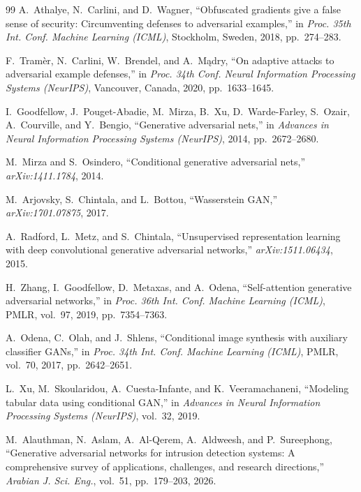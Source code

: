 \documentclass[11pt,a4paper]{article}
\begin{document}
\begin{thebibliography}{99}
 A.~Athalye, N.~Carlini, and D.~Wagner, ``Obfuscated
gradients give a false sense of security: Circumventing defenses to adversarial
examples,'' in \emph{Proc. 35th Int. Conf. Machine Learning (ICML)}, Stockholm,
Sweden, 2018, pp.~274--283.

 F.~Tram\`er, N.~Carlini, W.~Brendel, and A.~M\k{a}dry, ``On
adaptive attacks to adversarial example defenses,'' in \emph{Proc. 34th Conf.
Neural Information Processing Systems (NeurIPS)}, Vancouver, Canada, 2020,
pp.~1633--1645.

 I.~Goodfellow, J.~Pouget-Abadie, M.~Mirza, B.~Xu, D.~Warde-Farley,
S.~Ozair, A.~Courville, and Y.~Bengio, ``Generative adversarial nets,'' in
\emph{Advances in Neural Information Processing Systems (NeurIPS)}, 2014,
pp.~2672--2680.

 M.~Mirza and S.~Osindero, ``Conditional generative adversarial
nets,'' \emph{arXiv:1411.1784}, 2014.

 M.~Arjovsky, S.~Chintala, and L.~Bottou, ``Wasserstein GAN,''
\emph{arXiv:1701.07875}, 2017.

 A.~Radford, L.~Metz, and S.~Chintala, ``Unsupervised
representation learning with deep convolutional generative adversarial
networks,'' \emph{arXiv:1511.06434}, 2015.

 H.~Zhang, I.~Goodfellow, D.~Metaxas, and A.~Odena,
``Self-attention generative adversarial networks,'' in \emph{Proc. 36th Int.
Conf. Machine Learning (ICML)}, PMLR, vol.~97, 2019, pp.~7354--7363.

 A.~Odena, C.~Olah, and J.~Shlens, ``Conditional image synthesis
with auxiliary classifier GANs,'' in \emph{Proc. 34th Int. Conf. Machine
Learning (ICML)}, PMLR, vol.~70, 2017, pp.~2642--2651.

 L.~Xu, M.~Skoularidou, A.~Cuesta-Infante, and K.~Veeramachaneni,
``Modeling tabular data using conditional GAN,'' in \emph{Advances in Neural
Information Processing Systems (NeurIPS)}, vol.~32, 2019.

 M.~Alauthman, N.~Aslam, A.~Al-Qerem, A.~Aldweesh, and
P.~Sureephong, ``Generative adversarial networks for intrusion detection
systems: A comprehensive survey of applications, challenges, and research
directions,'' \emph{Arabian J. Sci. Eng.}, vol.~51, pp.~179--203, 2026.


\end{thebibliography}
\end{document}
